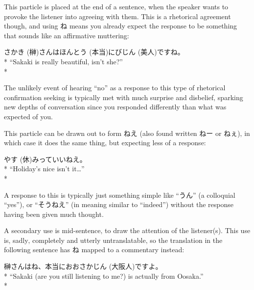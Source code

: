 \documentclass[11pt, b5paper, twoside, openright, onecolumn]{book}
\makeatletter
\newcommand*{\rubystack}[2]{{\relscale{0.5}%
  \begin{tabular}[b]{@{}c@{}}%
    {#1}\\%
   {\textscale{2}{#2}}%
  \end{tabular}}%
}
\DeclareRobustCommand*{\ruby}[2]{%
  \mbox{%
    \setlength{\parskip}{0ex}%
    \BeginAccSupp{method=pdfstringdef,ActualText={#1}}%
      \rubystack{\phantom{#2}}{#1}%
      \llap{%
        \rubystack{#2}{\phantom{#1}}%
      }%
    \EndAccSupp{}%
  }%
}
\renewcommand*{\ruby}[2]{#2 (#1)}%
\newenvironment{exampleblock}{
\setlength{\parindent}{0.6in}
\begin{minipage}[t]{\dimexpr\textwidth-\parindent}}
{\end{minipage}}
\makeatother
\begin{document}
This particle is placed at the end of a sentence‚ when the speaker wants to provoke the listener into agreeing with them. This is a rhetorical agreement though‚ and using ね means you already expect the response to be something that sounds like an affirmative muttering:

\vspace{0.4cm}
\begin{exampleblock}
\ruby{榊}{さかき}さんは\ruby{本当}{ほんとう}に\ruby{美人}{びじん}ですね。 \\* 
“Sakaki is really beautiful‚ isn’t she?” \\* 
\end{exampleblock}
\vspace{0.2cm}

The unlikely event of hearing “no” as a response to this type of rhetorical confirmation seeking is typically met with much surprise and disbelief‚ sparking new depths of conversation since you responded differently than what was expected of you.

This particle can be drawn out to form ねえ (also found written ねー or ねぇ)‚ in which case it does the same thing‚ but expecting less of a response:

\vspace{0.4cm}
\begin{exampleblock}
\ruby{休}{やす}みっていいねえ。 \\* 
“Holiday’s nice isn’t it…” \\* 
\end{exampleblock}
\vspace{0.2cm}

A response to this is typically just something simple like “うん” (a colloquial “yes”)‚ or “そうねえ” (in meaning similar to “indeed”) without the response having been given much thought.

A secondary use is mid-sentence‚ to draw the attention of the listener(s). This use is‚ sadly‚ completely and utterly untranslatable‚ so the translation in the following sentence has ね mapped to a commentary instead:

\vspace{0.4cm}
\begin{exampleblock}
榊さんはね、本当に\ruby{大阪人}{おおさかじん}ですよ。 \\* 
“Sakaki (are you still listening to me?) is actually from Oosaka.” \\* 
\end{exampleblock}
\vspace{0.2cm}
\end{document}

